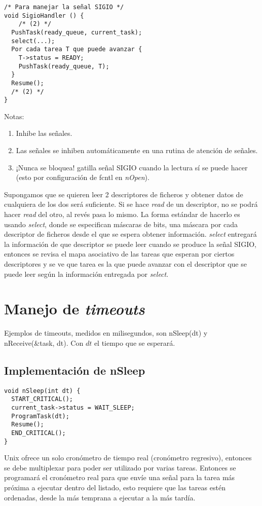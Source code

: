 \begin{verbatim}
/* Para manejar la señal SIGIO */
void SigioHandler () {
	/* (2) */
  PushTask(ready_queue, current_task);
  select(...);
  Por cada tarea T que puede avanzar {
    T->status = READY;
    PushTask(ready_queue, T);
  }
  Resume();
  /* (2) */
}
\end{verbatim}

Notas:
\begin{enumerate}[(1)]
	\item Inhibe las señales.
	\item Las señales se inhiben automáticamente en una rutina de atención de señales.
	\item ¡Nunca se bloquea! gatilla señal SIGIO cuando la lectura sí se puede hacer (esto por configuración de fcntl en \textit{nOpen}).
\end{enumerate}

Supongamos que se quieren leer 2 descriptores de ficheros y obtener datos de cualquiera de los dos será suficiente. Si se hace \textit{read} de un descriptor, no se podrá hacer \textit{read} del otro, al revés pasa lo mismo. La forma estándar de hacerlo es usando \textit{select}, donde se especifican máscaras de bits, una máscara por cada descriptor de ficheros desde el que se espera obtener información. \textit{select} entregará la información de que descriptor se puede leer cuando se produce la señal SIGIO, entonces se revisa el mapa asociativo de las tareas que esperan por ciertos descriptores y se ve que tarea es la que puede avanzar con el descriptor que se puede leer según la información entregada por \textit{select}.

\section{Manejo de \textit{timeouts}}
Ejemplos de timeouts, medidos en milisegundos, son nSleep(dt) y nReceive(\&task, dt). Con $dt$ el tiempo que se esperará.

\subsection{Implementación de nSleep}

\begin{verbatim}
void nSleep(int dt) {
  START_CRITICAL();
  current_task->status = WAIT_SLEEP;
  ProgramTask(dt);
  Resume();
  END_CRITICAL();
}
\end{verbatim}

Unix ofrece un solo cronómetro de tiempo real (cronómetro regresivo), entonces se debe multiplexar para poder ser utilizado por varias tareas. Entonces se programará el cronómetro real para que envíe una señal para la tarea más próxima a ejecutar dentro del listado, esto requiere que las tareas estén ordenadas, desde la más temprana a ejecutar a la más tardía.

